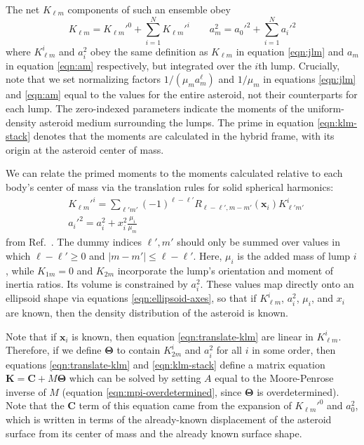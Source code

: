 \documentclass[fleqn,usenatbib]{mnras}
\begin{document}
The net $K_{\ell m}$ components of such an ensemble obey
\begin{equation}
  K_{\ell m} = K_{\ell m}'^0 + \sum_{i=1}^N K_{\ell m}'^i \qquad a_m^2 = a_0'^2 + \sum_{i=1}^N a_i'^2
  \label{eqn:klm-stack}
\end{equation}
where $K_{\ell m}^i$ and $a_i^2$ obey the same definition as $K_{\ell m}$ in equation \ref{eqn:jlm} and $a_m$ in equation \ref{eqn:am} respectively, but integrated over the $i$th lump. Crucially, note that we set normalizing factors $1/(\mu_m a_m^\ell)$ and $1/\mu_m$ in equations \ref{eqn:jlm} and \ref{eqn:am} equal to the values for the entire asteroid, not their counterparts for each lump. The zero-indexed parameters indicate the moments of the uniform-density asteroid medium surrounding the lumps. The prime in equation \ref{eqn:klm-stack} denotes that the moments are calculated in the hybrid frame, with its origin at the asteroid center of mass.

We can relate the primed moments to the moments calculated relative to each body's center of mass via the translation rules for solid spherical harmonics:
\begin{equation}
  \begin{split}
  & K_{\ell m}'^i = \sum_{\ell' m'} (-1)^{\ell - \ell'} R_{\ell - \ell', m - m'}(\bm x_i) K_{\ell' m'}^i\\
  & a_i'^2 = a_i^2 + x_i^2 \frac{\mu_i}{\mu_m}
  \end{split}
  \label{eqn:translate-klm}
\end{equation}
from Ref.~\cite{Gelderen1998TheSO}. The dummy indices $\ell', m'$ should only be summed over values in which $\ell-\ell' \geq 0$ and $|m-m'| \leq \ell - \ell'$. Here, $\mu_i$ is the added mass of lump $i$, while $K_{1m}=0$ and $K_{2m}$ incorporate the lump's orientation and moment of inertia ratios. Its volume is constrained by $a_i^2$. These values map directly onto an ellipsoid shape via equations \ref{eqn:ellipsoid-axes}, so that if $K_{\ell m}^i$, $a_i^2$, $\mu_i$, and $x_i$ are known, then the density distribution of the asteroid is known.

Note that if $\bm x_i$ is known, then equation \ref{eqn:translate-klm} are linear in $K_{\ell m}^i$. Therefore, if we define $\bm \Theta$ to contain $K_{2m}^i$ and $a_i^2$ for all $i$ in some order, then equations \ref{eqn:translate-klm} and \ref{eqn:klm-stack} define a matrix equation $\bm K = \bm C + M \bm \Theta$ which can be solved by setting $A$ equal to the Moore-Penrose inverse of $M$ (equation \ref{eqn:mpi-overdetermined}, since $\bm \Theta$ is overdetermined). Note that the $\bm C$ term of this equation came from the expansion of $K_{\ell m}'^0$ and $a_0^2$, which is written in terms of the already-known displacement of the asteroid surface from its center of mass and the already known surface shape.
\end{document}
